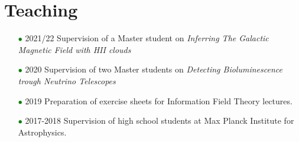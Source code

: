 \documentclass[11pt,a4paper,sans, table, dvipsnames]{moderncv}        %
\begin{document}
\section{Teaching}
\begin{itemize}
\item[\textcolor{Green}{$\bullet$}] 2021/22 Supervision of a Master student
on  \textit{Inferring The Galactic Magnetic Field with HII clouds}
\vspace{5pt}

\item[\textcolor{Green}{$\bullet$}] 2020 Supervision of two Master students on
\textit{Detecting Bioluminescence trough Neutrino Telescopes}

\vspace{5pt}

\item[\textcolor{Green}{$\bullet$}] 2019 Preparation of exercise sheets for Information Field Theory lectures.

\vspace{5pt}

\item[\textcolor{Green}{$\bullet$}] 2017-2018 Supervision of high school students at Max Planck Institute for Astrophysics.
\end{itemize}










%
\end{document}
